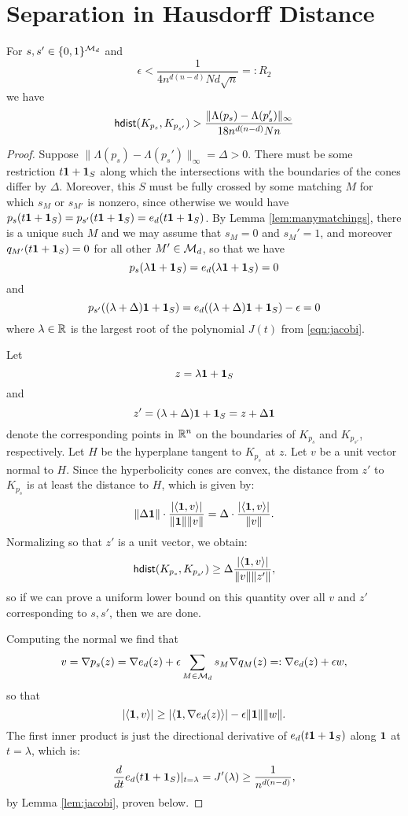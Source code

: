 \section{Separation in Hausdorff Distance} \label{sec:conesfar}
\begin{lemma} \label{lem:restrictiontocone} For $s, s'\in\{0,1\}^{\mathcal{M}_d}$ and 
$$\epsilon<\frac{1}{4n^{d(n-d)}Nd\sqrt{n}}=:R_2$$
we have
 $$\mathsf{hdist}(K_{p_s},K_{p_{s'}})>\frac{\|\Lambda(p_s)-\Lambda(p_s')\|_\infty}{18n^{d(n-d)}Nn}$$
\end{lemma}


\begin{proof}
Suppose $\|\Lambda(p_s)-\Lambda(p_s')\|_\infty=\Delta>0$. There must be some restriction $t \mathbf{1} + \mathbf{1}_S$ along which the intersections with the boundaries of the cones differ by $\Delta$. Moreover, this $S$ must be fully crossed by some matching $M$ for which $s_M$ or $s_{M'}$ is nonzero, since otherwise we would have $p_s(t\mathbf{1} + \mathbf{1}_S)=p_{s'}(t\mathbf{1} +\mathbf{1}_S)=e_d(t\mathbf{1}+\mathbf{1}_S)$. By Lemma \ref{lem:manymatchings}, there is a unique such $M$ and we may assume that $s_M=0$ and $s_M'=1$, and moreover $q_{M'}(t\mathbf{1}+\mathbf{1}_S)=0$ for all other $M'\in\mathcal{M}_d$, so that we have
$$p_s(\lambda\mathbf{1}+\mathbf{1}_S)=e_d(\lambda\mathbf{1}+\mathbf{1}_S)=0$$
and
$$p_{s'}((\lambda+\Delta)\mathbf{1}+\mathbf{1}_S) = e_d((\lambda+\Delta)\mathbf{1}+\mathbf{1}_S)-\epsilon=0$$
where $\lambda\in\mathbb{R}$ is the largest root of the polynomial $J(t)$ from \eqref{eqn:jacobi}.

Let 
$$z=\lambda\mathbf{1}+\mathbf{1}_S$$
and 
$$z'=(\lambda+\Delta)\mathbf{1}+\mathbf{1}_S=z+\Delta\mathbf{1}$$ denote the corresponding points in $\mathbb{R}^n$ on the boundaries of $K_{p_s}$ and $K_{p_{s'}}$, respectively.
Let $H$ be the hyperplane tangent to $K_{p_s}$ at $z$. Let $v$ be a unit vector normal to $H$. Since the hyperbolicity cones are convex, the distance from $z'$ to $K_{p_s}$ is at least the distance to $H$, which is given by:
\[ \|\Delta \mathbf{1}\|\cdot \frac{|\langle \mathbf{1}, v \rangle |}{\| \mathbf{1} \| \| v\|}=\Delta\cdot\frac{|\langle\mathbf{1},v\rangle|}{\|v\|}. \]
Normalizing so that $z'$ is a unit vector, we obtain:
\begin{equation} \label{eqn:zwv} \hdist(K_{p_{s}},K_{p_{s'}}) \geq \Delta \frac{|\langle \one, v \rangle|}{\| v\| \|z'\|},\end{equation}
so if we can prove a uniform lower bound on this quantity over all $v$ and $z'$ corresponding to $s,s'$, then we are done.


Computing the normal we find that 
$$v = \nabla p_s (z) = \nabla e_d(z) + \epsilon \sum_{M\in\mathcal{M}_d} s_M \nabla q_M(z)=:\nabla e_d(z)+\epsilon w,$$
so that
$$ |\langle \mathbf{1}, v\rangle| \ge |\langle \mathbf{1},\nabla e_d(z)\rangle|-\epsilon\|\mathbf{1}\|\|w\|.$$
The first inner product is just the directional derivative of $e_d(t\mathbf{1}+\mathbf{1}_S)$ along $\mathbf{1}$ at $t=\lambda$, which is:
\begin{equation} \label{eqn:jaclb}
\frac{d}{dt}e_d(t\one+\one_S)|_{t=\lambda}=J'(\lambda)\ge \frac{1}{n^{d(n-d)}},\end{equation}
by Lemma \ref{lem:jacobi}, proven below.


\end{proof}
